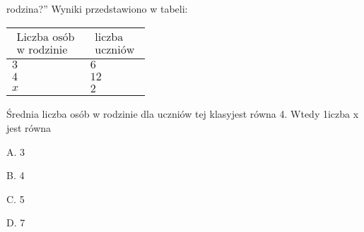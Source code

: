 \documentclass[a4paper,12pt]{article}
\begin{document}
rodzina?'' Wyniki przedstawiono w tabeli:
\begin{center}
\begin{tabular}{|l|l|}
\hline
\multicolumn{1}{|l|}{$\begin{array}{l}\mbox{Liczba osób}	\\	\mbox{w rodzinie}	\end{array}$}&	\multicolumn{1}{|l|}{$\begin{array}{l}\mbox{liczba}	\\	\mbox{uczniów}	\end{array}$}	\\
\hline
\multicolumn{1}{|l|}{ $3$}&	\multicolumn{1}{|l|}{ $6$}	\\
\hline
\multicolumn{1}{|l|}{ $4$}&	\multicolumn{1}{|l|}{ $12$}	\\
\hline
\multicolumn{1}{|l|}{ $x$}&	\multicolumn{1}{|l|}{ $2$}	\\
\hline
\end{tabular}

\end{center}
Średnia liczba osób w rodzinie dla uczniów tej klasyjest równa 4. Wtedy 1iczba x jest równa

A. 3

B. 4

C. 5

D. 7
\end{document}
